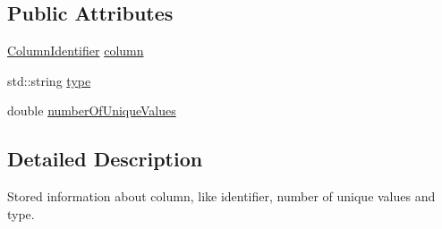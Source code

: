 \subsection*{Public Attributes}
\begin{DoxyCompactItemize}
\item 
\hyperlink{classrafe_1_1_column_identifier}{Column\+Identifier} \hyperlink{classrafe_1_1_column_info_a446710a3a03b249da265a785aff1ee18}{column}
\item 
std\+::string \hyperlink{classrafe_1_1_column_info_a22fd355567e1d07f30fd1deae721577f}{type}
\item 
double \hyperlink{classrafe_1_1_column_info_a3925986dda2c3385a512d6491e282aae}{number\+Of\+Unique\+Values}
\end{DoxyCompactItemize}


\subsection{Detailed Description}
Stored information about column, like identifier, number of unique values and type. 

